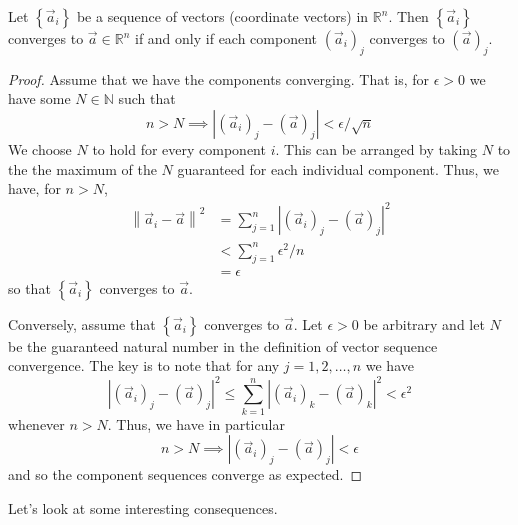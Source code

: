 \begin{prop}
Let $ \left\{ \vec{a}_i \right\} $ be a sequence of vectors (coordinate vectors) in $\mathbb{R}^n$. Then $\left\{ \vec{a}_i\right\}$ converges to $\vec{a} \in \mathbb{R}^n$ if and only if each component $\left(\vec{a}_i\right)_j$ converges to $\left(\vec{a}\right)_j$.
\end{prop}
\begin{proof}
Assume that we have the components converging. That is, for $\epsilon >0$ we have some $N \in \mathbb{N}$ such that  \[ n > N \implies \left| \left(\vec{a}_i\right)_j - \left(\vec{a}\right)_j \right| < \epsilon  / \sqrt{n} \]
We choose $N$ to hold for every component $i$. This can be arranged by taking $N$ to the the maximum of the $N$ guaranteed for each individual component. Thus, we have, for $n>N$,
\begin{align*}
	\left\lVert \vec{a}_i - \vec{a} \right\rVert^2 & = \sum_{j=1}^n \left\lvert  \left(\vec{a}_i\right)_j - \left(\vec{a}\right)_j \right\rvert^2 \\
	& < \sum_{j=1}^n \epsilon^2 / n \\
	& = \epsilon
\end{align*}
so that $\left\{ \vec{a}_i \right\}$ converges to $\vec{a}$. 

Conversely, assume that $\left\{ \vec{a}_i \right\}$ converges to $\vec{a}$. Let $\epsilon > 0 $ be arbitrary and let $N$ be the guaranteed natural number in the definition of vector sequence convergence. The key is to note that for any $j = 1,2,\ldots, n$ we have \[ \left\lvert \left(\vec{a}_i\right)_j - \left(\vec{a}\right)_j \right\rvert^2 \leq \sum_{k=1}^n \left\lvert \left(\vec{a}_i\right)_k - \left(\vec{a}\right)_k \right\rvert^2 < \epsilon^2 \] whenever $n>N$. Thus, we have in particular \[ n>N \implies \left\lvert \left(\vec{a}_i\right)_j - \left(\vec{a}\right)_j \right\rvert < \epsilon \] and so the component sequences converge as expected.
\end{proof}








Let's look at some interesting consequences.

